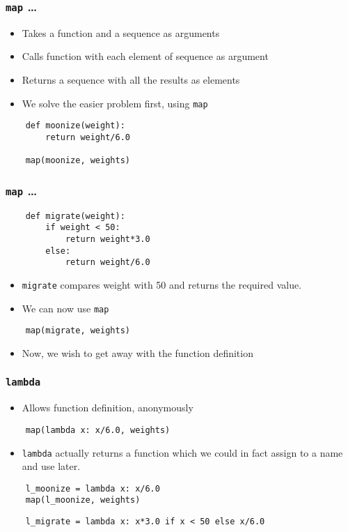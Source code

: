 \begin{frame}[fragile]
  \frametitle{\texttt{map} \ldots}
  \begin{itemize}
  \item Takes a function and a sequence as arguments
  \item Calls function with each element of sequence as argument
  \item Returns a sequence with all the results as elements
  \item We solve the easier problem first, using \texttt{map}
  \end{itemize}

  \begin{lstlisting}
    def moonize(weight):
        return weight/6.0

    map(moonize, weights)
  \end{lstlisting}
\end{frame}

\begin{frame}[fragile]
  \frametitle{\texttt{map} \ldots}
  \begin{lstlisting}
    def migrate(weight):
        if weight < 50:
            return weight*3.0
        else:
            return weight/6.0
  \end{lstlisting}

  \begin{itemize}
  \item \texttt{migrate} compares weight with 50 and returns the
    required value.
  \item We can now use \texttt{map}
  \end{itemize}
  \begin{lstlisting}
    map(migrate, weights)
  \end{lstlisting}
  \begin{itemize}
  \item Now, we wish to get away with the function definition
  \end{itemize}
\end{frame}

\begin{frame}[fragile]
  \frametitle{\texttt{lambda}}
  \begin{itemize}
  \item Allows function definition, anonymously
  \end{itemize}
  \begin{lstlisting}
    map(lambda x: x/6.0, weights)
  \end{lstlisting}
  \begin{itemize}
  \item \texttt{lambda} actually returns a function which we could in
    fact assign to a name and use later.
  \end{itemize}
  \begin{lstlisting}
    l_moonize = lambda x: x/6.0
    map(l_moonize, weights)
  \end{lstlisting}
  \begin{lstlisting}
    l_migrate = lambda x: x*3.0 if x < 50 else x/6.0
  \end{lstlisting}
\end{frame}

